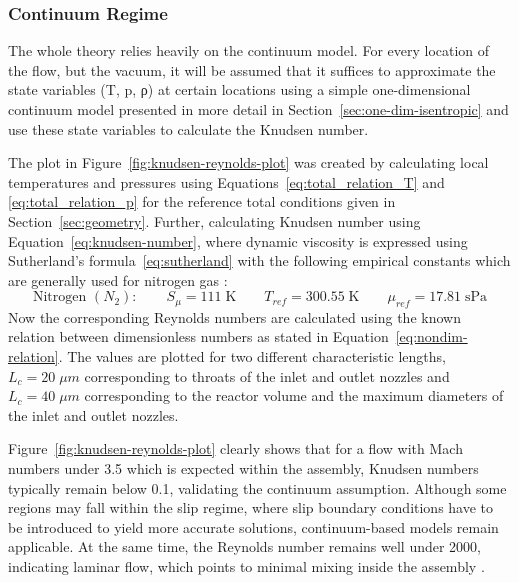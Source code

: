 \subsubsection*{Continuum Regime}
	The whole theory relies heavily on the continuum model.
	For every location of the flow, but the vacuum, it will be assumed that it suffices to approximate the state variables (T, p, ρ) at certain locations using a simple one-dimensional continuum model presented in more detail in Section~\ref{sec:one-dim-isentropic} and use these state variables to calculate the Knudsen number.

	The plot in Figure~\ref{fig:knudsen-reynolds-plot} was created by calculating local temperatures and pressures using Equations~\eqref{eq:total_relation_T} and \eqref{eq:total_relation_p} for the reference total conditions given in Section~\ref{sec:geometry}.
	Further, calculating Knudsen number using Equation~\eqref{eq:knudsen-number}, where dynamic viscosity is expressed using Sutherland's formula~\eqref{eq:sutherland} with the following empirical constants which are generally used for nitrogen gas \cite{kim2004numericalanalysisflowcharacteristics}:
	$$
		\text{Nitrogen }(N_2):
			\qquad
		S_\mu = 111\;\text{K}
			\qquad
		T_{ref} = 300.55\;\text{K}
			\qquad
		\mu_{ref} = 17.81\; \text{sPa}
	$$
	Now the corresponding Reynolds numbers are calculated using the known relation between dimensionless numbers as stated in Equation~\eqref{eq:nondim-relation}.
	The values are plotted for two different characteristic lengths, $L_c = 20\;\mu m$ corresponding to throats of the inlet and outlet nozzles and $L_c = 40\;\mu m$ corresponding to the reactor volume and the maximum diameters of the inlet and outlet nozzles.

	Figure~\ref{fig:knudsen-reynolds-plot} clearly shows that for a flow with Mach numbers under 3.5 which is expected within the assembly, Knudsen numbers typically remain below 0.1, validating the continuum assumption.
	Although some regions may fall within the slip regime, where slip boundary conditions have to be introduced to yield more accurate solutions, continuum-based models remain applicable. 
	At the same time, the Reynolds number remains well under 2000, indicating laminar flow, which points to minimal mixing inside the assembly \cite{ames1953compressible, comsol_microfluidics_guide}.
	\newpage

